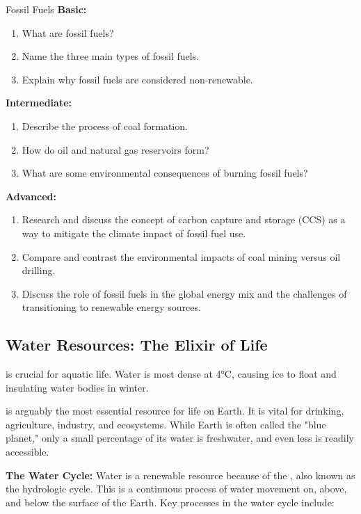 \begin{tieredquestions}{Fossil Fuels}
\textbf{Basic:}
\begin{enumerate}
    \item What are fossil fuels?
    \item Name the three main types of fossil fuels.
    \item Explain why fossil fuels are considered non-renewable.
\end{enumerate}
\textbf{Intermediate:}
\begin{enumerate}
    \item Describe the process of coal formation.
    \item How do oil and natural gas reservoirs form?
    \item What are some environmental consequences of burning fossil fuels?
\end{enumerate}
\textbf{Advanced:}
\begin{enumerate}
    \item Research and discuss the concept of carbon capture and storage (CCS) as a way to mitigate the climate impact of fossil fuel use.
    \item Compare and contrast the environmental impacts of coal mining versus oil drilling.
    \item  Discuss the role of fossil fuels in the global energy mix and the challenges of transitioning to renewable energy sources.
\end{enumerate}
\end{tieredquestions}

\subsection{Water Resources: The Elixir of Life}

\begin{marginnote}
 is crucial for aquatic life.  Water is most dense at 4°C, causing ice to float and insulating water bodies in winter.
\end{marginnote}

 is arguably the most essential resource for life on Earth.  It is vital for drinking, agriculture, industry, and ecosystems.  While Earth is often called the "blue planet," only a small percentage of its water is freshwater, and even less is readily accessible.

\textbf{The Water Cycle:} Water is a renewable resource because of the , also known as the hydrologic cycle. This is a continuous process of water movement on, above, and below the surface of the Earth.  Key processes in the water cycle include:

